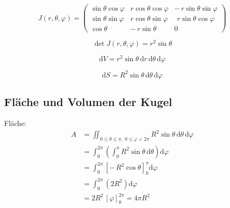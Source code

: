 \documentclass[a4paper,11pt,oneside,open=any,parskip=half, DIV=15]{scrreprt}
\begin{document}
      \[
         J(r,\theta,\varphi)=
         \begin{pmatrix}
            \sin\theta\cos\varphi & r\cos\theta\cos\varphi & -\,r\sin\theta\sin\varphi\\[2pt]
            \sin\theta\sin\varphi & r\cos\theta\sin\varphi & \ \,r\sin\theta\cos\varphi\\[2pt]
            \cos\theta            & -\,r\sin\theta         & 0
         \end{pmatrix}
      \]

      \begin{importantbox}
         \[
            \det J(r,\theta,\varphi)=r^{2}\sin\theta
         \]
      \end{importantbox}

      \begin{importantbox}
         \[
         \mathrm{d}V=r^{2}\sin\theta\,\mathrm{d}r\,\mathrm{d}\theta\,\mathrm{d}\varphi
         \]
      \end{importantbox}

      \begin{importantbox}
         \[
         \mathrm{d}S=R^{2}\sin\theta\,\mathrm{d}\theta\,\mathrm{d}\varphi
         \]
      \end{importantbox}


   \subsection*{Fläche und Volumen der Kugel}

   Fläche:
   \begin{align*}
      A 
      &= \iint_{0\le\theta\le\pi,\;0\le\varphi<2\pi} R^{2}\sin\theta\,\mathrm d\theta\,\mathrm d\varphi \tag{Grundformel aufstellen}\\[4pt]
      &= \int_{0}^{2\pi}\!\left(\int_{0}^{\pi} R^{2}\sin\theta\,\mathrm d\theta\right)\mathrm d\varphi \tag{Grenzen einsetzen}\\[4pt]
      &= \int_{0}^{2\pi}\!\left[-\,R^{2}\cos\theta\right]_{0}^{\pi}\mathrm d\varphi \tag{\(\theta\) integrieren}\\[4pt]
      &= \int_{0}^{2\pi}\! \left(2R^{2}\right)\mathrm d\varphi \tag{Grenzen auswerten}\\[4pt]
      &= 2R^{2}\,\left[\varphi\right]_{0}^{2\pi}
      = 4\pi R^{2}\tag{Ergebnis}
   \end{align*}
\end{document}
